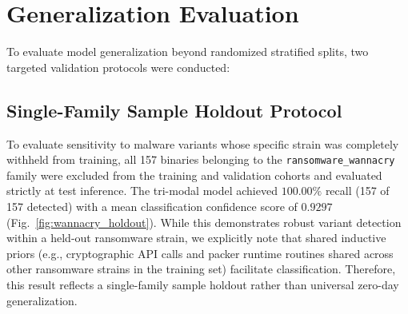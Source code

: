 \documentclass[pdflatex,sn-mathphys-num]{sn-jnl}
\begin{document}
\begin{tableorg}[t]
\centering
\caption{Controlled ablation analysis evaluating marginal contributions of modalities and objectives.}\label{tab:ablation_results}
\end{tableorg}

\section{Generalization Evaluation}\label{sec:generalization}
To evaluate model generalization beyond randomized stratified splits, two targeted validation protocols were conducted:

\subsection{Single-Family Sample Holdout Protocol}\label{sec:gen_family}
To evaluate sensitivity to malware variants whose specific strain was completely withheld from training, all 157 binaries belonging to the \texttt{ransomware\_wannacry} family were excluded from the training and validation cohorts and evaluated strictly at test inference. The tri-modal model achieved $100.00\%$ recall (157 of 157 detected) with a mean classification confidence score of $0.9297$ (Fig.~\ref{fig:wannacry_holdout}). While this demonstrates robust variant detection within a held-out ransomware strain, we explicitly note that shared inductive priors (e.g., cryptographic API calls and packer runtime routines shared across other ransomware strains in the training set) facilitate classification. Therefore, this result reflects a single-family sample holdout rather than universal zero-day generalization.
\end{document}
